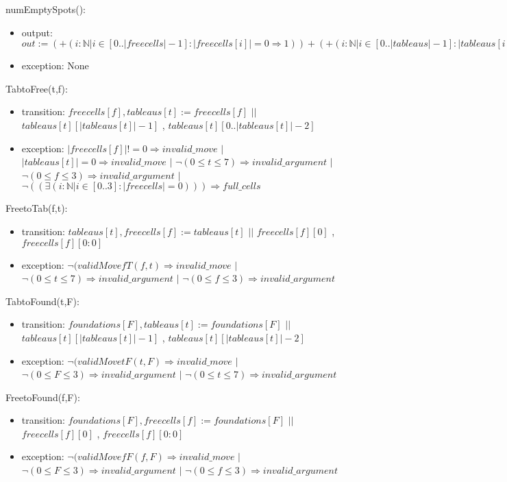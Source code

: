 \documentclass[12pt]{article}
\begin{document}
\noindent numEmptySpots():
\begin{itemize}
\item output: $out := (+(i:\mathbb{N}|i \in [0..|freecells|-1]:|freecells[i]| = 0 \Rightarrow 1)) +  (+(i:\mathbb{N}|i \in [0..|tableaus|-1]:|tableaus[i]| = 0 \Rightarrow 1))$
\item exception: None
\end{itemize}

\noindent TabtoFree(t,f):
\begin{itemize}
\item transition: $freecells[f], tableaus[t] :=  freecells[f]$ $||$ $tableaus[t][|tableaus[t]|-1]$ , $tableaus[t][0..|tableaus[t]|-2]$
\item exception: $|freecells[f]| != 0 \Rightarrow invalid\_move$ $|$  $|tableaus[t]| = 0 \Rightarrow invalid\_move$ $|$ $\neg( 0 \le t \le 7) \Rightarrow invalid\_argument$ $|$ $\neg( 0 \le f \le 3) \Rightarrow invalid\_argument$ $|$ $\neg((\exists(i : \mathbb{N} | i \in [0..3]: |freecells| = 0))) \Rightarrow full\_cells$
\end{itemize} 


\noindent FreetoTab(f,t):
\begin{itemize}
\item transition: $tableaus[t], freecells[f] :=  tableaus[t]$ $||$ $freecells[f][0]$ , $freecells[f][0:0]$
\item exception: $\neg(validMovefT(f,t) \Rightarrow invalid\_move$ $|$ $\neg( 0 \le t \le 7) \Rightarrow invalid\_argument$ $|$ $\neg( 0 \le f \le 3) \Rightarrow invalid\_argument$
\end{itemize}


\noindent TabtoFound(t,F):
\begin{itemize}
\item transition: $foundations[F], tableaus[t] := foundations[F]$ $||$ $tableaus[t][|tableaus[t]|-1]$ , $tableaus[t][|tableaus[t]|-2]$
\item exception: $\neg(validMovetF(t,F) \Rightarrow invalid\_move$ $|$ $\neg( 0 \le F \le 3) \Rightarrow invalid\_argument$ $|$ $\neg( 0 \le t \le 7) \Rightarrow invalid\_argument$
\end{itemize} 

\noindent FreetoFound(f,F):
\begin{itemize}
\item transition: $foundations[F], freecells[f] := foundations[F]$ $||$ $freecells[f][0]$ , $freecells[f][0:0]$
\item exception: $\neg(validMovefF(f,F) \Rightarrow invalid\_move$ $|$ $\neg( 0 \le F \le 3) \Rightarrow invalid\_argument$ $|$ $\neg( 0 \le f \le 3) \Rightarrow invalid\_argument$
\end{itemize} 
\end{document}
